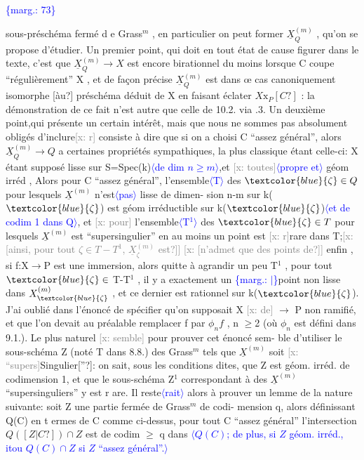 \documentclass[11pt]{article}
\newcommand{\scanpage}[1]{\par\bigskip\noindent{\small\sffamily[scan #1]}\par}
\newcommand{\mspage}[1]{{\small\sffamily[p.\,#1]}}
\newcommand{\hand}[1]{\textcolor{blue}{#1}}
\let\over\relax
\newcommand{\over}[2]{\textcolor{gray}{#1}\textcolor{blue}{\ensuremath{^{\!\nearrow}}#2}}
\newcommand{\inserted}[2][]{\textcolor{blue}{$\langle$#2$\rangle$}}
\newcommand{\margin}[1]{\textcolor{blue}{\{\textsf{marg.:} #1\}}}
\newcommand{\xout}[1]{\textcolor{gray}{[\textsf{x:} #1]}}
\newcommand{\unsure}[1]{[#1?]}
\begin{document}
\margin{73}

\clearpage
\scanpage{25/74}
\mspage{\hand{\unsure{61|6}}}

sous-préschéma fermé d e Grass$^{m}$ , en particulier on peut former $\underline{X}^{(m)}_{Q}$ ,
qu'on se propose d'étudier. Un premier point, qui doit en tout état de
cause figurer dans le texte, c'est que $\underline{X}^{(m)}_{Q} \longrightarrow X$ est encore birationnel
du moins lorsque C coupe ``régulièrement'' X , et de façon précise $\underline{X}^{(m)}_{Q}$
est dans œ cas canoniquement isomorphe \unsure{àu} préschéma déduit de X en
faisant éclater $X\mathrm{x}_{P}\unsure{C}$ : la démonstration de ce fait n'est autre que celle
de 10.2. via \over{10}{\unsure{18}}.3. Un deuxième point,qui présente un certain intérêt,
mais que nous ne sommes pas absolument obligés d'inclure\xout{r} consiste à
dire que si on a choisi C ``assez général'', alors $\underline{X}^{(m)}_{Q} \longrightarrow Q$ a certaines
propriétés sympathiques, la plus classique étant celle-ci: X étant
supposé lisse sur S=Spec(k)\inserted[typed]{de dim $n \geq m$},et \xout{toutes}\inserted[typed]{propre et} géom irréd , Alors pour C ``assez
général'', l'ensemble\inserted[typed]{T} des $\hand{\zeta}\in Q$ pour lesquels $\underline{X}^{(m)}$ n'est\inserted[typed]{pas} lisse de dimen-%
sion n-m sur k($\hand{\zeta}$) est géom irréductible sur k($\hand{\zeta}$)\inserted[typed]{et de codim 1 dans Q}, et \xout{pour}
l'ensemble\inserted[typed]{T$^{1}$} des $\hand{\zeta}\in T$ pour lesquels $\underline{X}^{(m)}$ est ``supersingulier'' en au
moins un point est \xout{r}rare dans T;\xout{\unsure{ainsi, pour tout $\zeta \in T-T^{1}$, $\underline{X}^{(m)}_{\zeta}$ est}}
\xout{\unsure{n'admet que des points de}} enfin , si f:X$\rightarrow$P est une immersion, alors
quitte à agrandir un peu T$^{1}$ , pour tout $\hand{\zeta}\in$ T-T$^{1}$ , il y a exactement un
\margin{$|$}point non lisse dans $X^{(m)}_{\hand{\zeta}}$ , et ce dernier est rationnel sur k($\hand{\zeta}$). J'ai
oublié dans l'énoncé de spécifier qu'on supposait X \xout{de} $\longrightarrow$ P non ramifié,
et que l'on devait au préalable remplacer f par $\phi_{n}f$ , n $\geq$2 (où $\phi_{n}$ est
défini dans 9.1.). Le plus naturel \xout{semble} pour prouver cet énoncé sem-%
ble d'utiliser le sous-schéma Z (noté T dans 8.8.) des Grass$^{m}$ tels
que $\underline{X}^{(m)}$ soit \xout{``supers}Singulier\unsure{''}: on sait, sous les conditions dites, que Z
est géom. irréd. de codimension 1, et que le sous-schéma Z$^{1}$ correspondant
à des $\underline{X}^{(m)}$ ``supersinguliers'' y est r are. Il reste\inserted{rait} alors à prouver un
lemme de la nature suivante: soit Z une partie fermée de Grass$^{m}$ de codi-%
mension q, alors définissant Q(C) en t ermes de C comme ci-dessus, pour
tout C ``assez général'' l'intersection $Q(\unsure{Z|C})\cap Z$ est de codim $\geq$ q dans
\inserted{$Q(C)$; de plus, si $Z$ géom. irréd., itou $Q(C)\cap Z$ si $Z$ ``assez général''.}
\end{document}
